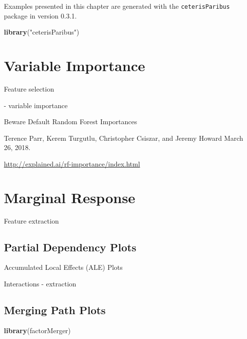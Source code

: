 \documentclass[]{krantz}
\newenvironment{Shaded}{\begin{snugshade}}{\end{snugshade}}
\newcommand{\KeywordTok}[1]{\textcolor[rgb]{0.13,0.29,0.53}{\textbf{#1}}}
\newcommand{\NormalTok}[1]{#1}
\newcommand{\StringTok}[1]{\textcolor[rgb]{0.31,0.60,0.02}{#1}}
\theoremstyle{definition}
\theoremstyle{definition}
\theoremstyle{definition}
\theoremstyle{remark}
\begin{document}
Examples presented in this chapter are generated with the
\texttt{ceterisParibus} package in version 0.3.1.

\begin{Shaded}
\begin{Highlighting}[]
\KeywordTok{library}\NormalTok{(}\StringTok{"ceterisParibus"}\NormalTok{)}
\end{Highlighting}
\end{Shaded}

\hypertarget{variable-importance}{%
\section{Variable Importance}\label{variable-importance}}

Feature selection

\citep{Strobl2007} \citep{Strobl2008} - variable importance

\citep{2018arXiv180101489F}

Beware Default Random Forest Importances

Terence Parr, Kerem Turgutlu, Christopher Csiszar, and Jeremy Howard
March 26, 2018.

\url{http://explained.ai/rf-importance/index.html}

\hypertarget{marginal-response}{%
\section{Marginal Response}\label{marginal-response}}

Feature extraction

\hypertarget{partialDependence}{%
\subsection{Partial Dependency Plots}\label{partialDependence}}

\citep{RJ2017016} \citep{MAGIX}

Accumulated Local Effects (ALE) Plots \citep{R-ALEPlot}

Interactions - extraction

\hypertarget{merging-path-plots}{%
\subsection{Merging Path Plots}\label{merging-path-plots}}

\citep{R-factorMerger}

\begin{Shaded}
\begin{Highlighting}[]
\KeywordTok{library}\NormalTok{(factorMerger)}
\end{Highlighting}
\end{Shaded}
\end{document}

